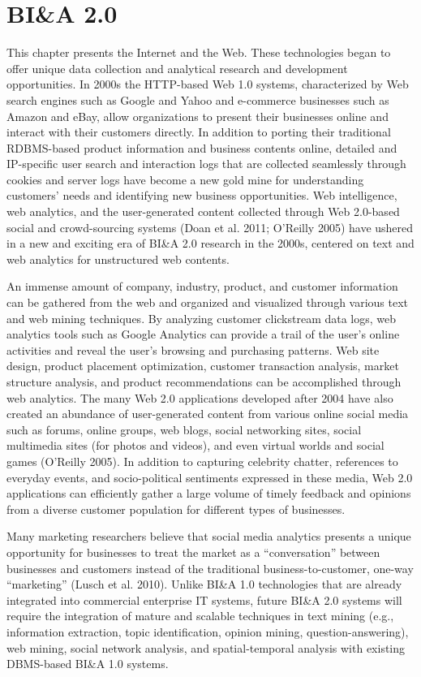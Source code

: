 \section{BI\&A 2.0}
This chapter presents the Internet and the Web. These technologies began to offer
unique data collection and analytical research and development opportunities. In 2000s the HTTP-based Web 1.0 systems,
characterized by Web search engines such as Google and
Yahoo and e-commerce businesses such as Amazon and
eBay, allow organizations to present their businesses online
and interact with their customers directly. 
In addition to porting their traditional RDBMS-based product information
and business contents online, detailed and IP-specific user
search and interaction logs that are collected seamlessly
through cookies and server logs have become a new gold
mine for understanding customers’ needs and identifying new
business opportunities. Web intelligence, web analytics, and
the user-generated content collected through Web 2.0-based
social and crowd-sourcing systems (Doan et al. 2011;
O’Reilly 2005) have ushered in a new and exciting era of
BI\&A 2.0 research in the 2000s, centered on text and web
analytics for unstructured web contents.

An immense amount of company, industry, product, and
customer information can be gathered from the web and
organized and visualized through various text and web mining
techniques. By analyzing customer clickstream data logs,
web analytics tools such as Google Analytics can provide a
trail of the user’s online activities and reveal the user’s
browsing and purchasing patterns. Web site design, product
placement optimization, customer transaction analysis, market
structure analysis, and product recommendations can be
accomplished through web analytics. The many Web 2.0
applications developed after 2004 have also created an abundance of user-generated content from various online social
media such as forums, online groups, web blogs, social networking sites, social multimedia sites (for photos and videos),
and even virtual worlds and social games (O’Reilly 2005). In
addition to capturing celebrity chatter, references to everyday
events, and socio-political sentiments expressed in these
media, Web 2.0 applications can efficiently gather a large
volume of timely feedback and opinions from a diverse
customer population for different types of businesses.

Many marketing researchers believe that social media
analytics presents a unique opportunity for businesses to treat
the market as a “conversation” between businesses and
customers instead of the traditional business-to-customer,
one-way “marketing” (Lusch et al. 2010). Unlike BI\&A 1.0
technologies that are already integrated into commercial
enterprise IT systems, future BI\&A 2.0 systems will require
the integration of mature and scalable techniques in text
mining (e.g., information extraction, topic identification,
opinion mining, question-answering), web mining, social
network analysis, and spatial-temporal analysis with existing
DBMS-based BI\&A 1.0 systems.

